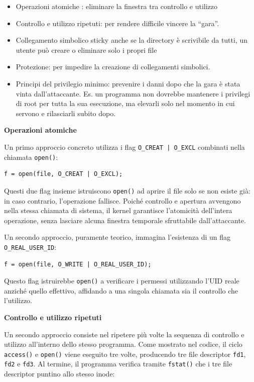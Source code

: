 \documentclass{article}
\begin{document}
\begin{itemize}
	\item Operazioni atomiche : eliminare la finestra tra controllo e utilizzo
	\item Controllo e utilizzo ripetuti: per rendere difficile vincere la “gara”.
	\item Collegamento simbolico sticky anche se la directory è scrivibile da tutti, un utente può creare o eliminare solo i propri file
	\item Protezione: per impedire la creazione di collegamenti simbolici.
	\item Principi del privilegio minimo: prevenire i danni dopo che la gara è stata vinta dall'attaccante. Es. un programma non dovrebbe mantenere i privilegi di root per tutta la sua esecuzione, ma elevarli solo nel momento in cui servono e rilasciarli subito dopo.
\end{itemize}

\textbf{Operazioni atomiche}

Un primo approccio concreto utilizza i flag \texttt{O\_CREAT | O\_EXCL} 
combinati nella chiamata \texttt{open()}:

\begin{verbatim}
f = open(file, O_CREAT | O_EXCL);
\end{verbatim}

Questi due flag insieme istruiscono \texttt{open()} ad aprire il file 
solo se non esiste già: in caso contrario, l'operazione fallisce. 
Poiché controllo e apertura avvengono nella stessa chiamata di sistema, 
il kernel garantisce l'atomicità dell'intera operazione, senza lasciare 
alcuna finestra temporale sfruttabile dall'attaccante.

Un secondo approccio, puramente teorico, immagina l'esistenza di un flag 
\texttt{O\_REAL\_USER\_ID}:

\begin{verbatim}
f = open(file, O_WRITE | O_REAL_USER_ID);
\end{verbatim}

Questo flag istruirebbe \texttt{open()} a verificare i permessi 
utilizzando l'UID reale anziché quello effettivo, affidando a una singola 
chiamata sia il controllo che l'utilizzo. 

\textbf{Controllo e utilizzo ripetuti}

Un secondo approccio consiste nel ripetere più volte la sequenza di 
controllo e utilizzo all'interno dello stesso programma. Come mostrato 
nel codice, il ciclo \texttt{access()} e \texttt{open()} viene eseguito 
tre volte, producendo tre file descriptor \texttt{fd1}, \texttt{fd2} e 
\texttt{fd3}. Al termine, il programma verifica tramite \texttt{fstat()} 
che i tre file descriptor puntino allo stesso inode:
\end{document}
